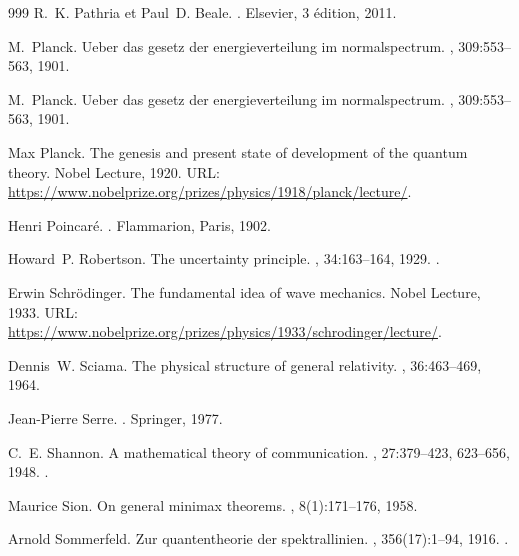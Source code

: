 \begin{thebibliography}{999}
R.~K. Pathria et Paul~D. Beale.
.
\newblock Elsevier, 3 édition, 2011.

M.~Planck.
\newblock Ueber das gesetz der energieverteilung im normalspectrum.
, 309:553--563, 1901.

M.~Planck.
\newblock Ueber das gesetz der energieverteilung im normalspectrum.
, 309:553--563, 1901.

Max Planck.
\newblock The genesis and present state of development of the quantum theory.
\newblock Nobel Lecture, 1920.
\newblock URL:
  \url{https://www.nobelprize.org/prizes/physics/1918/planck/lecture/}.

Henri Poincaré.
.
\newblock Flammarion, Paris, 1902.

Howard~P. Robertson.
\newblock The uncertainty principle.
, 34:163--164, 1929.
\newblock \href {https://doi.org/10.1103/PhysRev.34.163}
  {}.

Erwin Schrödinger.
\newblock The fundamental idea of wave mechanics.
\newblock Nobel Lecture, 1933.
\newblock URL:
  \url{https://www.nobelprize.org/prizes/physics/1933/schrodinger/lecture/}.

Dennis~W. Sciama.
\newblock The physical structure of general relativity.
, 36:463--469, 1964.

Jean-Pierre Serre.
.
\newblock Springer, 1977.

C.~E. Shannon.
\newblock A mathematical theory of communication.
, 27:379--423, 623--656, 1948.
\newblock \href {https://doi.org/10.1002/j.1538-7305.1948.tb01338.x}
  {}.

Maurice Sion.
\newblock On general minimax theorems.
, 8(1):171--176, 1958.

Arnold Sommerfeld.
\newblock Zur quantentheorie der spektrallinien.
, 356(17):1--94, 1916.
\newblock \href {https://doi.org/10.1002/andp.19163561702}
  {}.


\end{thebibliography}
